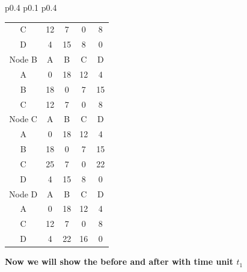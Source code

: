 \documentclass{article}
\begin{document}
\begin{tabular}{p{0.4\linewidth} p{0.1\linewidth} p{0.4\linewidth}}
\begin{tabular}{c|c|c|c|c}
    C & 12 & 7 & 0 & 8 \\
    D & 4 & 15 & 8 & 0 \\
    \hline
    \hline
    Node B & A & B & C & D \\
    \hline 
    A & 0 & 18 & 12 & 4 \\
    B & 18 & 0 & 7 & 15 \\
    C & 12 & 7 & 0 & 8 \\
    \hline
    \hline
    Node C & A & B & C & D \\
    \hline
    A & 0 & 18 & 12 & 4 \\
    B & 18 & 0 & 7 & 15 \\
    C & \color{red}25 & 7 & 0 & \color{red}22 \\
    D & 4 & 15 & 8 & 0 \\
    \hline
    \hline
    Node D & A & B & C & D \\
    \hline
    A & 0 & 18 & 12 & 4 \\
    C & 12 & 7 & 0 & 8 \\
    D & 4 & \color{red}22 & \color{red}16 & 0 \\
    \hline
\end{tabular}
\end{tabular}
\newline
\textbf{Now we will show the before and after with time unit $t_1$}\\
\newline
\end{document}

